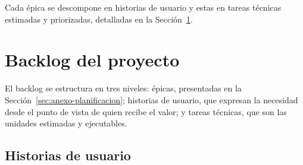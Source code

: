 Cada épica se descompone en historias de usuario y estas en tareas técnicas
estimadas y priorizadas, detalladas en la Sección~\ref{sec:anexo-backlog}.


\section{Backlog del proyecto}
\label{sec:anexo-backlog}

El backlog se estructura en tres niveles: épicas, presentadas en la
Sección~\ref{sec:anexo-planificacion}; historias de usuario, que expresan la necesidad desde el
punto de vista de quien recibe el valor; y tareas técnicas, que son las unidades
estimadas y ejecutables.

\subsection{Historias de usuario}
\label{sec:anexo-historias}

